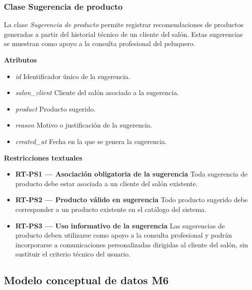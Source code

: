 \subsubsection{Clase Sugerencia de producto}

La clase \textit{Sugerencia de producto} permite registrar recomendaciones de productos generadas a partir del historial técnico de un cliente del salón. Estas sugerencias se muestran como apoyo a la consulta profesional del peluquero.

\textbf{Atributos}

\begin{itemize}

      \item \textit{id}
            Identificador único de la sugerencia.
      \item \textit{salon\_client}
            Cliente del salón asociado a la sugerencia.
      \item \textit{product}
            Producto sugerido.
      \item \textit{reason}
            Motivo o justificación de la sugerencia.
      \item \textit{created\_at}
            Fecha en la que se genera la sugerencia.

\end{itemize}

\textbf{Restricciones textuales}

\begin{itemize}

      \item \textbf{RT-PS1 — Asociación obligatoria de la sugerencia}
            Toda sugerencia de producto debe estar asociada a un cliente del salón existente.
      \item \textbf{RT-PS2 — Producto válido en sugerencia}
            Todo producto sugerido debe corresponder a un producto existente en el catálogo del sistema.
      \item \textbf{RT-PS3 — Uso informativo de la sugerencia}
            Las sugerencias de producto deben utilizarse como apoyo a la consulta profesional y podrán incorporarse a comunicaciones personalizadas dirigidas al cliente del salón, sin sustituir el criterio técnico del usuario.
\end{itemize}

\subsection{Modelo conceptual de datos M6}

